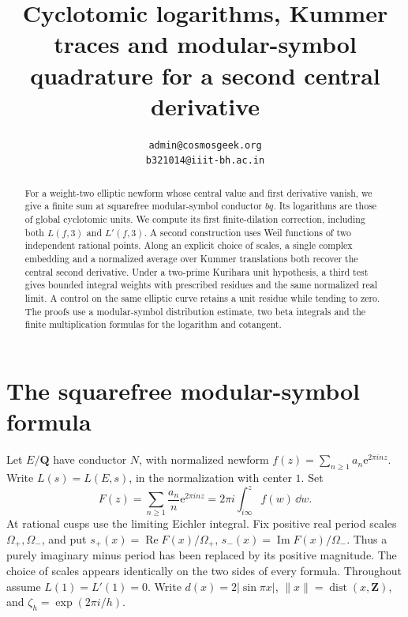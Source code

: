 \documentclass[11pt]{article}
\title{Cyclotomic logarithms, Kummer traces and modular-symbol quadrature for a second central derivative}
\author{\small\texttt{admin@cosmosgeek.org}\\[-1pt]\small\texttt{b321014@iiit-bh.ac.in}}
\date{}
\newcommand{\Q}{\mathbf Q}\newcommand{\R}{\mathbf R}\newcommand{\Z}{\mathbf Z}
\newcommand{\e}{\mathrm e}\newcommand{\im}{\operatorname{Im}}\newcommand{\re}{\operatorname{Re}}
\newcommand{\dist}{\operatorname{dist}}\newcommand{\av}{\operatorname{Av}}
\begin{document}
\maketitle
\begin{abstract}
For a weight-two elliptic newform whose central value and first derivative vanish,
we give a finite sum at squarefree modular-symbol conductor \(bq\). Its logarithms
are those of global cyclotomic units. We compute its first finite-dilation
correction, including both \(L(f,3)\) and \(L'(f,3)\). A second construction
uses Weil functions of two independent rational points. Along an explicit choice of
scales, a single complex embedding and a normalized average over Kummer
translations both recover the central second derivative. Under a two-prime
Kurihara unit hypothesis, a third test gives bounded integral weights
with prescribed residues and the same normalized real limit. A control
on the same elliptic curve retains a unit residue while tending to zero.
The proofs use a
modular-symbol distribution estimate, two beta integrals and the finite
multiplication formulas for the logarithm and cotangent.
\end{abstract}

\section{The squarefree modular-symbol formula}
Let \(E/\Q\) have conductor \(N\), with normalized newform
\(f(z)=\sum_{n\ge1}a_n\e^{2\pi inz}\). Write \(L(s)=L(E,s)\), in the
normalization with center \(1\). Set
\[
 F(z)=\sum_{n\ge1}\frac{a_n}{n}\e^{2\pi inz}
     =2\pi i\int_{i\infty}^{z}f(w)\,\dd w .
\]
At rational cusps use the limiting Eichler integral. Fix positive real period
scales \(\Omega_+,\Omega_-\), and put
\(s_+(x)=\re F(x)/\Omega_+\), \(s_-(x)=\im F(x)/\Omega_-\).
Thus a purely imaginary minus period has been replaced by its positive
magnitude. The choice of scales appears identically on the two sides of
every formula. Throughout assume \(L(1)=L'(1)=0\). Write
\(d(x)=2|\sin\pi x|\), \(\|x\|=\dist(x,\Z)\), and
\(\zeta_h=\exp(2\pi i/h)\).
\end{document}
